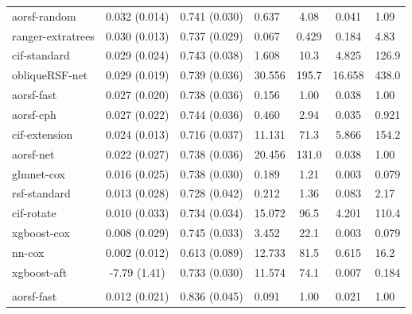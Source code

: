 \documentclass[twoside,11pt]{article}\usepackage[]{graphicx}\usepackage[]{xcolor}
\newenvironment{knitrout}{}{} %
\begin{document}
\begin{knitrout}
\begin{longtable}{lcclccl}
\hline
\hspace{1em}aorsf-random & 0.032 (0.014) & 0.741 (0.030) & 0.637 & 4.08 & 0.041 & 1.09\\
\hspace{1em}ranger-extratrees & 0.030 (0.013) & 0.737 (0.029) & 0.067 & 0.429 & 0.184 & 4.83\\
\hspace{1em}cif-standard & 0.029 (0.024) & 0.743 (0.038) & 1.608 & 10.3 & 4.825 & 126.9\\
\hspace{1em}obliqueRSF-net & 0.029 (0.019) & 0.739 (0.036) & 30.556 & 195.7 & 16.658 & 438.0\\
\hspace{1em}aorsf-fast & 0.027 (0.020) & 0.738 (0.036) & 0.156 & 1.00 & 0.038 & 1.00\\
\hspace{1em}aorsf-cph & 0.027 (0.022) & 0.744 (0.036) & 0.460 & 2.94 & 0.035 & 0.921\\
\hspace{1em}cif-extension & 0.024 (0.013) & 0.716 (0.037) & 11.131 & 71.3 & 5.866 & 154.2\\
\hspace{1em}aorsf-net & 0.022 (0.027) & 0.738 (0.036) & 20.456 & 131.0 & 0.038 & 1.00\\
\hspace{1em}glmnet-cox & 0.016 (0.025) & 0.738 (0.030) & 0.189 & 1.21 & 0.003 & 0.079\\
\hspace{1em}rsf-standard & 0.013 (0.028) & 0.728 (0.042) & 0.212 & 1.36 & 0.083 & 2.17\\
\hspace{1em}cif-rotate & 0.010 (0.033) & 0.734 (0.034) & 15.072 & 96.5 & 4.201 & 110.4\\
\hspace{1em}xgboost-cox & 0.008 (0.029) & 0.745 (0.033) & 3.452 & 22.1 & 0.003 & 0.079\\
\hspace{1em}nn-cox & 0.002 (0.012) & 0.613 (0.089) & 12.733 & 81.5 & 0.615 & 16.2\\
\hspace{1em}xgboost-aft & -7.79 (1.41) & 0.733 (0.030) & 11.574 & 74.1 & 0.007 & 0.184\\
\addlinespace[0.3em]
\hline
\multicolumn{7}{l}{\textit{\textbf{ACTG 320; death, n = 1151, p = 12}}}\\
\hline
\hspace{1em}aorsf-fast & 0.012 (0.021) & 0.836 (0.045) & 0.091 & 1.00 & 0.021 & 1.00\\

\end{longtable}
\end{knitrout}
\end{document}
